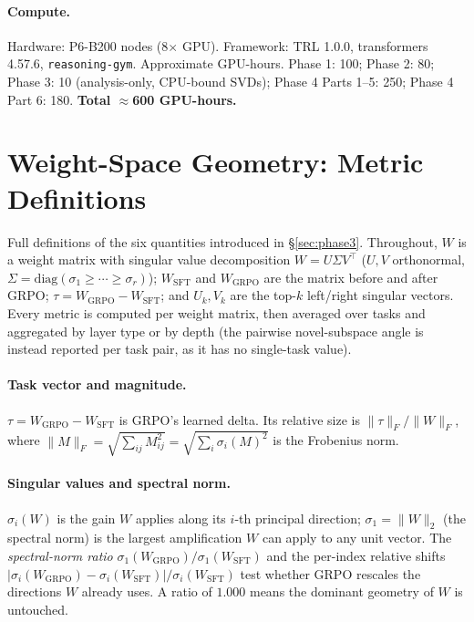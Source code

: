 \documentclass{article}
\newcommand{\tv}{\tau}
\newcommand{\Wsft}{W_{\mathrm{SFT}}}
\newcommand{\Wg}{W_{\mathrm{GRPO}}}
\begin{document}
\paragraph{Compute.} Hardware: P6-B200 nodes (8$\times$ GPU). Framework: TRL 1.0.0, transformers
4.57.6, \texttt{reasoning-gym}. Approximate GPU-hours. Phase 1: 100; Phase 2: 80; Phase 3: 10
(analysis-only, CPU-bound SVDs); Phase 4 Parts 1--5: 250; Phase 4 Part 6: 180. \textbf{Total
$\approx$600 GPU-hours.}

\section{Weight-Space Geometry: Metric Definitions}
\label{app:geom}
Full definitions of the six quantities introduced in \S\ref{sec:phase3}. Throughout, $W$ is a
weight matrix with singular value decomposition $W=U\Sigma V^\top$ ($U,V$ orthonormal,
$\Sigma=\mathrm{diag}(\sigma_1\geq\cdots\geq\sigma_r)$); $\Wsft$ and $\Wg$ are the matrix before and
after GRPO; $\tv=\Wg-\Wsft$; and $U_k,V_k$ are the top-$k$ left/right singular vectors. Every metric
is computed per weight matrix, then averaged over tasks and aggregated by layer type or by depth
(the pairwise novel-subspace angle is instead reported per task pair, as it has no single-task value).

\paragraph{Task vector and magnitude.} $\tv=\Wg-\Wsft$ is GRPO's learned delta. Its relative size is
$\|\tv\|_F/\|W\|_F$, where $\|M\|_F=\sqrt{\sum_{ij}M_{ij}^2}=\sqrt{\sum_i\sigma_i(M)^2}$ is the
Frobenius norm.

\paragraph{Singular values and spectral norm.} $\sigma_i(W)$ is the gain $W$ applies along its
$i$-th principal direction; $\sigma_1=\|W\|_2$ (the spectral norm) is the largest amplification $W$
can apply to any unit vector. The \emph{spectral-norm ratio} $\sigma_1(\Wg)/\sigma_1(\Wsft)$ and the
per-index relative shifts $|\sigma_i(\Wg)-\sigma_i(\Wsft)|/\sigma_i(\Wsft)$ test whether GRPO
rescales the directions $W$ already uses. A ratio of $1.000$ means the dominant geometry of $W$ is
untouched.
\end{document}
